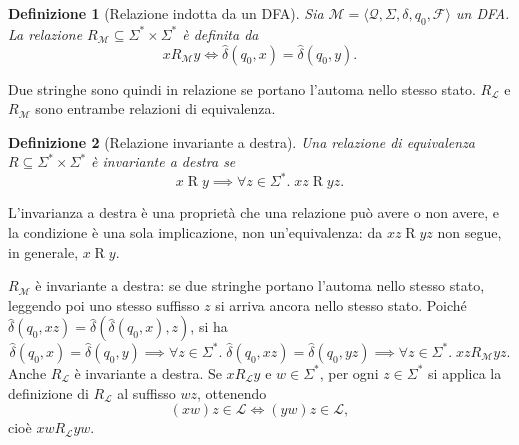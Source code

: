 \documentclass[a4paper, 11pt, oneside]{book}
\theoremstyle{formale}
\newtheorem*{definition}{Definizione}
\begin{document}
    \begin{definition}[Relazione indotta da un DFA]
        Sia $\mathcal{M} = \langle \mathcal{Q}, \Sigma, \delta, q_0, \mathcal{F} \rangle$
        un DFA. La relazione $R_{\mathcal{M}} \subseteq \Sigma^* \times \Sigma^*$ \`e
        definita da
        \begin{equation*}
            x \mathrel{R_{\mathcal{M}}} y \iff \hat{\delta}(q_0, x) = \hat{\delta}(q_0, y).
        \end{equation*}
    \end{definition}
    Due stringhe sono quindi in relazione se portano l'automa nello stesso stato.
    $R_{\mathcal{L}}$ e $R_{\mathcal{M}}$ sono entrambe relazioni di equivalenza.

    \begin{definition}[Relazione invariante a destra]
        Una relazione di equivalenza $R \subseteq \Sigma^* \times \Sigma^*$ \`e
        \emph{invariante a destra} se
        \begin{equation*}
            x \mathrel{R} y \implies \forall z \in \Sigma^*.\; xz \mathrel{R} yz.
        \end{equation*}
    \end{definition}
    L'invarianza a destra \`e una propriet\`a che una relazione pu\`o avere o non avere, e
    la condizione \`e una sola implicazione, non un'equivalenza: da $xz \mathrel{R} yz$ non
    segue, in generale, $x \mathrel{R} y$.

    $R_{\mathcal{M}}$ \`e invariante a destra: se due stringhe portano l'automa nello
    stesso stato, leggendo poi uno stesso suffisso $z$ si arriva ancora nello stesso
    stato. Poich\'e $\hat{\delta}(q_0, xz) = \hat{\delta}(\hat{\delta}(q_0, x), z)$, si ha
    \begin{equation*}
        \hat{\delta}(q_0, x) = \hat{\delta}(q_0, y)
        \implies
        \forall z \in \Sigma^*.\; \hat{\delta}(q_0, xz) = \hat{\delta}(q_0, yz)
        \implies
        \forall z \in \Sigma^*.\; xz \mathrel{R_{\mathcal{M}}} yz.
    \end{equation*}
    Anche $R_{\mathcal{L}}$ \`e invariante a destra. Se $x \mathrel{R_{\mathcal{L}}} y$ e
    $w \in \Sigma^*$, per ogni $z \in \Sigma^*$ si applica la definizione di
    $R_{\mathcal{L}}$ al suffisso $wz$, ottenendo
    \begin{equation*}
        (xw)z \in \mathcal{L} \iff (yw)z \in \mathcal{L},
    \end{equation*}
    cio\`e $xw \mathrel{R_{\mathcal{L}}} yw$.
\end{document}
